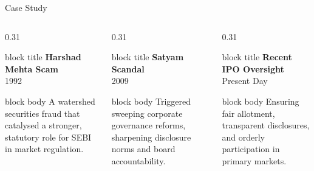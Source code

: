 \documentclass[aspectratio=169,10pt]{beamer}
\begin{document}
	\begin{frame}{Case Study}
		\vfill
		\begin{columns}[T]
			\begin{column}{0.31\textwidth}
				\begin{beamercolorbox}[rounded=true, sep=8pt]{block title}
					\centering\textbf{Harshad Mehta Scam}\\[2pt]
					\textcolor{rpBase}{\small 1992}
				\end{beamercolorbox}
				\vspace{-2pt}
				\begin{beamercolorbox}[rounded=true, sep=10pt]{block body}
					\footnotesize A watershed securities fraud that catalysed a stronger, statutory role for SEBI in market regulation.
				\end{beamercolorbox}
			\end{column}
			\begin{column}{0.31\textwidth}
				\begin{beamercolorbox}[rounded=true, sep=8pt]{block title}
					\centering\textbf{Satyam Scandal}\\[2pt]
					\textcolor{rpBase}{\small 2009}
				\end{beamercolorbox}
				\vspace{-2pt}
				\begin{beamercolorbox}[rounded=true, sep=10pt]{block body}
					\footnotesize Triggered sweeping corporate governance reforms, sharpening disclosure norms and board accountability.
				\end{beamercolorbox}
			\end{column}
			\begin{column}{0.31\textwidth}
				\begin{beamercolorbox}[rounded=true, sep=8pt]{block title}
					\centering\textbf{Recent IPO Oversight}\\[2pt]
					\textcolor{rpBase}{\small Present Day}
				\end{beamercolorbox}
				\vspace{-2pt}
				\begin{beamercolorbox}[rounded=true, sep=10pt]{block body}
					\footnotesize Ensuring fair allotment, transparent disclosures, and orderly participation in primary markets.
				\end{beamercolorbox}
			\end{column}
		\end{columns}
		\vfill
	\end{frame}
	
\end{document}
